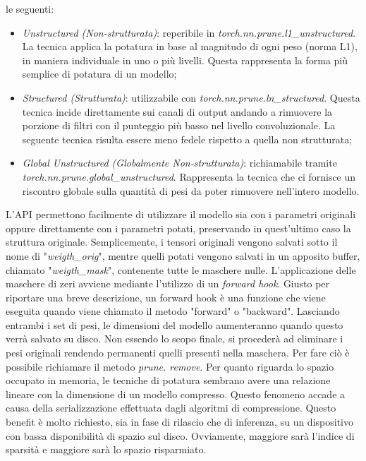 le seguenti:
\begin{itemize}
    \item \emph{Unstructured (Non-strutturata)}: reperibile in \emph{torch.nn.prune.l1\_unstructured}. 
    La tecnica applica la potatura in base al magnitudo di ogni peso (norma 
    L1), in maniera individuale in uno o più livelli. Questa rappresenta 
    la forma più semplice di potatura di un modello;
    \item \emph{Structured (Strutturata)}:  utilizzabile con \emph{torch.nn.prune.ln\_structured}. 
    Questa tecnica incide direttamente sui canali di output andando a 
    rimuovere la porzione di filtri con il punteggio più basso nel livello 
    convoluzionale. La seguente tecnica risulta essere meno fedele rispetto 
    a quella non strutturata;
    \item \emph{Global Unstructured (Globalmente Non-strutturata)}: richiamabile tramite 
    \emph{torch.nn.prune.global\_unstructured}. Rappresenta la tecnica che 
    ci fornisce un riscontro globale sulla quantità di pesi da poter rimuovere 
    nell'intero modello.
\end{itemize}
L'API permettono facilmente di utilizzare il modello sia con i parametri originali 
oppure direttamente con i parametri potati, preservando in quest'ultimo 
caso la struttura originale. Semplicemente, i tensori originali vengono salvati 
sotto il nome di "\emph{weigth\_orig}", mentre quelli potati vengono salvati in un 
apposito buffer, chiamato "\emph{weigth\_mask}", contenente tutte le maschere 
nulle. L'applicazione delle maschere di zeri avviene mediante l'utilizzo di un 
\emph{forward hook}. Giusto per riportare una breve descrizione, un forward hook è 
una funzione che viene eseguita quando viene chiamato il metodo "forward" 
o "backward". Lasciando entrambi i set di pesi, le dimensioni del modello 
aumenteranno quando questo verrà salvato su disco. Non essendo lo scopo 
finale, si procederà ad eliminare i pesi originali rendendo permanenti quelli 
presenti nella maschera. Per fare ciò è possibile richiamare il metodo \emph{prune.
remove}. Per quanto riguarda lo spazio occupato in memoria, le tecniche 
di potatura sembrano avere una relazione lineare con la dimensione di un 
modello compresso. Questo fenomeno accade a causa della serializzazione 
effettuata dagli algoritmi di compressione. Questo benefit è molto richiesto, 
sia in fase di rilascio che di inferenza, su un dispositivo 
con bassa disponibilità di spazio sul disco. Ovviamente, maggiore sarà l'indice di sparsità e 
maggiore sarà lo spazio risparmiato. 


